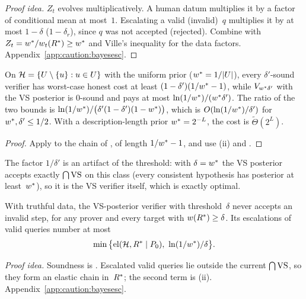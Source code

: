 \begin{proof}[Proof idea]
$Z_t$ evolves multiplicatively. A human datum multiplies it by a factor of conditional mean at most~$1$. Escalating a valid (invalid)~$q$ multiplies it by at most $1-\delta$ ($1-\delta_r$), since $q$ was not accepted (rejected). Combine with $Z_t=w^{*}/w_t(R^{*})\ge w^{*}$ and Ville's inequality for the data factors. Appendix~\ref{app:caution:bayesesc}.
\end{proof}

\begin{corollary}\label{cor:caution:bayesopt}
On $\mathcal{H}=\{U\setminus\{u\}:u\in U\}$ with the uniform prior ($w^{*}=1/|U|$), every $\delta'$-sound verifier has worst-case honest cost at least $(1-\delta')(1/w^{*}-1)$, while $V_{w^{*}\delta'}$ with the VS posterior is $0$-sound and pays at most $\ln(1/w^{*})/(w^{*}\delta')$. The ratio of the two bounds is $\ln(1/w^{*})/\big(\delta'(1-\delta')(1-w^{*})\big)$, which is $O(\ln(1/w^{*})/\delta')$ for $w^{*},\delta'\le1/2$. With a description-length prior $w^{*}=2^{-L}$, the cost is $\tilde\Theta(2^L)$.
\end{corollary}

\begin{proof}
Apply  to the chain of , of length $1/w^{*}-1$, and use (ii) and .
\end{proof}

The factor $1/\delta'$ is an artifact of the threshold: with $\delta=w^{*}$ the VS posterior accepts exactly $\bigcap\mathrm{VS}$ on this class (every consistent hypothesis has posterior at least~$w^{*}$), so it is the VS verifier itself, which is exactly optimal.

\begin{corollary}\label{cor:caution:structbayes}
With truthful data, the VS-posterior verifier with threshold~$\delta$ never accepts an invalid step, for any prover and every target with $w(R^{*})\ge\delta$. Its escalations of valid queries number at most
\[
\min\big\{\el(\Hc,\Rstar\mid P_0),\ \ln(1/\wstar)/\delta\big\}.
\]
\end{corollary}

\noindent\emph{Proof idea.} Soundness is . Escalated valid queries lie outside the current $\bigcap\mathrm{VS}$, so they form an elastic chain in~$R^{*}$; the second term is (ii). Appendix~\ref{app:caution:bayesesc}.

